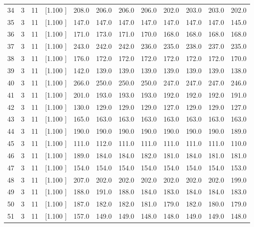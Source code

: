 \documentclass[12pt,a4paper]{article}
\begin{document}
\begin{center}
{\begin{tabular}{r r r r r r r r r r r r}
  34&  3& 11&[1.100     ]&   208.0&   206.0&   206.0&   206.0&   202.0&   203.0&   203.0&   202.0\\[-0.02in]
  35&  3& 11&[1.100     ]&   147.0&   147.0&   147.0&   147.0&   147.0&   147.0&   147.0&   145.0\\[-0.02in]
  36&  3& 11&[1.100     ]&   171.0&   173.0&   171.0&   170.0&   168.0&   168.0&   168.0&   168.0\\[-0.02in]
  37&  3& 11&[1.100     ]&   243.0&   242.0&   242.0&   236.0&   235.0&   238.0&   237.0&   235.0\\[-0.02in]
  38&  3& 11&[1.100     ]&   176.0&   172.0&   172.0&   172.0&   172.0&   172.0&   172.0&   170.0\\[-0.02in]
  39&  3& 11&[1.100     ]&   142.0&   139.0&   139.0&   139.0&   139.0&   139.0&   139.0&   138.0\\[-0.02in]
  40&  3& 11&[1.100     ]&   266.0&   250.0&   250.0&   250.0&   247.0&   247.0&   247.0&   246.0\\[-0.02in]
  41&  3& 11&[1.100     ]&   201.0&   193.0&   193.0&   193.0&   192.0&   192.0&   192.0&   191.0\\[-0.02in]
  42&  3& 11&[1.100     ]&   130.0&   129.0&   129.0&   129.0&   127.0&   129.0&   129.0&   127.0\\[-0.02in]
  43&  3& 11&[1.100     ]&   165.0&   163.0&   163.0&   163.0&   163.0&   163.0&   163.0&   163.0\\[-0.02in]
  44&  3& 11&[1.100     ]&   190.0&   190.0&   190.0&   190.0&   190.0&   190.0&   190.0&   189.0\\[-0.02in]
  45&  3& 11&[1.100     ]&   111.0&   112.0&   111.0&   111.0&   111.0&   111.0&   111.0&   110.0\\[-0.02in]
  46&  3& 11&[1.100     ]&   189.0&   184.0&   184.0&   182.0&   181.0&   184.0&   181.0&   181.0\\[-0.02in]
  47&  3& 11&[1.100     ]&   154.0&   154.0&   154.0&   154.0&   154.0&   154.0&   154.0&   153.0\\[-0.02in]
  48&  3& 11&[1.100     ]&   207.0&   202.0&   202.0&   202.0&   202.0&   202.0&   202.0&   199.0\\[-0.02in]
  49&  3& 11&[1.100     ]&   188.0&   191.0&   188.0&   184.0&   183.0&   184.0&   184.0&   183.0\\[-0.02in]
  50&  3& 11&[1.100     ]&   187.0&   182.0&   182.0&   181.0&   179.0&   182.0&   180.0&   179.0\\[-0.02in]
  51&  3& 11&[1.100     ]&   157.0&   149.0&   149.0&   148.0&   148.0&   149.0&   149.0&   148.0\\[-0.02in]

\end{tabular}}
\end{center}
\end{document}
